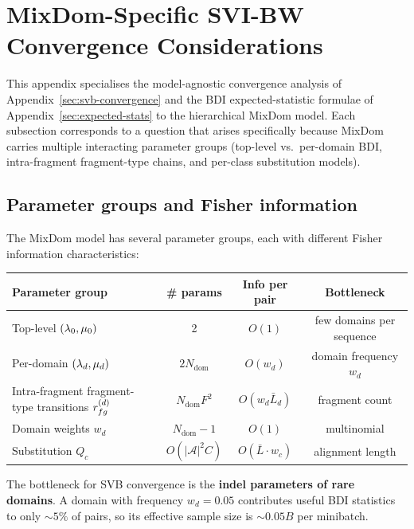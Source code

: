 \section{MixDom-Specific SVI-BW Convergence Considerations}
\label{sec:svb-convergence-mixdom}

This appendix specialises the model-agnostic convergence analysis
of Appendix~\ref{sec:svb-convergence} and the BDI expected-statistic
formulae of Appendix~\ref{sec:expected-stats} to the hierarchical
MixDom model.  Each subsection corresponds to a question that arises
specifically because MixDom carries multiple interacting parameter
groups (top-level vs.\ per-domain BDI, intra-fragment fragment-type
chains, and per-class substitution models).

\subsection{Parameter groups and Fisher information}
\label{sec:svb-mixdom-param-groups}

The MixDom model has several parameter groups, each with different
Fisher information characteristics:

\begin{center}
\begin{tabular}{lccc}
\toprule
Parameter group & \# params & Info per pair & Bottleneck \\
\midrule
Top-level $(\lambda_0, \mu_0)$ & 2 & $O(1)$ & few domains per sequence \\
Per-domain $(\lambda_d, \mu_d)$ & $2N_{\text{dom}}$ & $O(w_d)$ & domain frequency $w_d$ \\
Intra-fragment fragment-type transitions $r^{(d)}_{fg}$ & $N_{\text{dom}} F^2$ & $O(w_d \bar L_d)$ & fragment count \\
Domain weights $w_d$ & $N_{\text{dom}}-1$ & $O(1)$ & multinomial \\
Substitution $Q_c$ & $O(|\mathcal{A}|^2 C)$ & $O(\bar L \cdot w_c)$ & alignment length \\
\bottomrule
\end{tabular}
\end{center}

The bottleneck for SVB convergence is the \textbf{indel parameters of rare
domains}. A domain with frequency $w_d = 0.05$ contributes useful
BDI statistics to only $\sim 5\%$ of pairs, so its effective sample
size is $\sim 0.05 B$ per minibatch.

